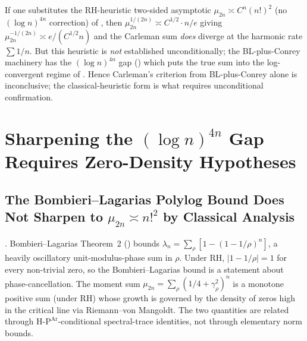 \begin{remark}
\label{v4-arith:r-audit:rem:heuristic-saves}
If one substitutes the RH-heuristic two-sided asymptotic
\(\mu_{2n}\asymp C^{n}(n!)^{2}\) (no \((\log n)^{4n}\) correction) of
, then
\(\mu_{2n}^{1/(2n)}\asymp C^{1/2}\cdot n/e\) giving
\(\mu_{2n}^{-1/(2n)}\asymp e/(C^{1/2}n)\) and the Carleman sum
\emph{does} diverge at the harmonic rate \(\sum 1/n\). But this
heuristic is \emph{not} established unconditionally; the
BL-plus-Conrey machinery has the \((\log n)^{4n}\) gap
() which puts the
true sum into the log-convergent regime of
. Hence Carleman's
criterion from BL-plus-Conrey alone is inconclusive; the
classical-heuristic form is what requires unconditional
confirmation.
\end{remark}

\section{Sharpening the \((\log n)^{4n}\) Gap Requires Zero-Density Hypotheses}
\label{v4-arith:r-audit:gap-analysis}

\subsection{The Bombieri--Lagarias Polylog Bound Does Not Sharpen to \(\mu_{2n}\asymp n!^{2}\) by Classical Analysis}
\label{v4-arith:r-audit:can-BL-sharpen}

\begin{proposition}
\label{v4-arith:r-audit:prop:BL-vs-mu}
\ClaimStatusProvedHere. Bombieri--Lagarias Theorem~2
() bounds
\(\lambda_{n}=\sum_{\rho}[1-(1-1/\rho)^{n}]\), a heavily
oscillatory unit-modulus-phase sum in \(\rho\). Under RH, \(|1-1/\rho|=1\)
for every non-trivial zero, so the Bombieri--Lagarias bound is a
statement about phase-cancellation. The moment sum
\(\mu_{2n}=\sum_{\rho}(1/4+\gamma_{\rho}^{2})^{n}\) is a monotone
positive sum (under RH) whose growth is governed by the density of
zeros high in the critical line via Riemann--von Mangoldt. The two
quantities are related through
\(\mathrm{H\text{-}P}^{\mathrm{Ar}}\)-conditional spectral-trace
identities, not through elementary norm bounds.
\end{proposition}

